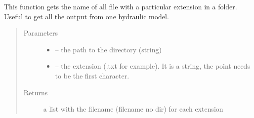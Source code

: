 \documentclass[letterpaper,10pt,english]{sphinxmanual}
\begin{document}
\begin{fulllineitems}
\label{\detokenize{index:src.load_hdf5.get_all_filename}}
This function gets the name of all file with a particular extension in a folder. Useful to get all the output
from one hydraulic model.
\begin{quote}\begin{description}
\item[{Parameters}] \leavevmode\begin{itemize}
\item {} 
 -- the path to the directory (string)

\item {} 
 -- the extension (.txt for example). It is a string, the point needs to be the first character.

\end{itemize}

\item[{Returns}] \leavevmode
a list with the filename (filename no dir) for each extension

\end{description}\end{quote}

\end{fulllineitems}

\end{document}
